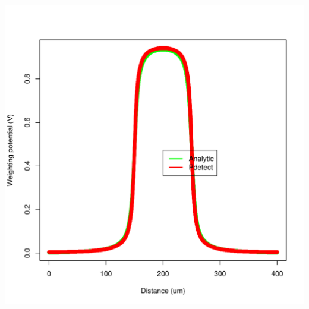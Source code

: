 \documentclass[14pt]{beamer}
\begin{document}
\begin{frame}
\begin{columns}
      \begin{column}{0.5\textwidth}
        \begin{center}
          \includegraphics[width=\textwidth]{images/horizon-top.pdf}
        \end{center}

      \end{column}
    \end{columns}

\end{frame}
\end{document}
